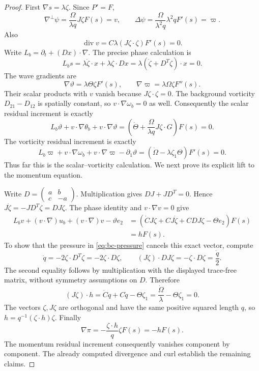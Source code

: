 \begin{proof}
First $\nabla s=\lambda\zeta$. Since $P'=F$,
\[
\nabla^\perp\psi=\frac{\Omega}{\lambda q}J\zeta F(s)=v,\qquad
\Delta\psi=\frac{\Omega}{\lambda^2q}\lambda^2q F'(s)=\varpi.
\]
Also
\[
\operatorname{div}v=C\lambda(J\zeta\cdot\zeta)F'(s)=0.
\]
Write $L_b=\partial_t+(Dx)\cdot\nabla$. The precise phase calculation is
\[
L_bs=\lambda\dot\zeta\cdot x+\lambda\zeta\cdot Dx
=\lambda(\dot\zeta+D^T\zeta)\cdot x=0.
\]
The wave gradients are
\[
\nabla\vartheta=\lambda\Theta\zeta F'(s),\qquad
\nabla\varpi=\lambda\Omega\zeta F''(s).
\]
Their scalar products with $v$ vanish because $J\zeta\cdot\zeta=0$.
The background vorticity $D_{21}-D_{12}$ is spatially constant, so
$v\cdot\nabla\omega_b=0$ as well. Consequently the scalar residual
increment is exactly
\[
L_b\vartheta+v\cdot\nabla\theta_b+v\cdot\nabla\vartheta
=\left(\dot\Theta+\frac{\Omega}{\lambda q}J\zeta\cdot G\right)F(s)=0.
\]
The vorticity residual increment is exactly
\[
L_b\varpi+v\cdot\nabla\omega_b+v\cdot\nabla\varpi-\partial_1\vartheta
=(\dot\Omega-\lambda\zeta_1\Theta)F'(s)=0.
\]
Thus far this is the scalar--vorticity calculation. We next prove its
explicit lift to the momentum equation.

Write
$D=\left(\begin{smallmatrix}a&b\\c&-a\end{smallmatrix}\right)$.
Multiplication gives $DJ+JD^T=0$. Hence
$J\dot\zeta=-JD^T\zeta=DJ\zeta$. The phase identity and
$v\cdot\nabla v=0$ give
\begin{align*}
L_bv+(v\cdot\nabla)u_b+(v\cdot\nabla)v-\vartheta e_2
&=(\dot C J\zeta+CJ\dot\zeta+CDJ\zeta-\Theta e_2)F(s)\\
&=hF(s).
\end{align*}
To show that the pressure in \eqref{eq:bc-pressure} cancels this exact
vector, compute
\[
\dot q=-2\zeta\cdot D^T\zeta=-2\zeta\cdot D\zeta,\qquad
(J\zeta)\cdot DJ\zeta=-\zeta\cdot D\zeta=\frac{\dot q}{2}.
\]
The second equality follows by multiplication with the displayed
trace-free matrix, without symmetry assumptions on $D$. Therefore
\[
(J\zeta)\cdot h
=\dot Cq+C\dot q-\Theta\zeta_1
=\frac{\dot\Omega}{\lambda}-\Theta\zeta_1=0.
\]
The vectors $\zeta,J\zeta$ are orthogonal and have the same positive
squared length $q$, so
$h=q^{-1}(\zeta\cdot h)\zeta$.
Finally
\[
\nabla\pi=-\frac{\zeta\cdot h}{q}\zeta F(s)=-hF(s).
\]
The momentum residual increment consequently vanishes component by
component. The already computed divergence and curl establish the
remaining claims.
\end{proof}

